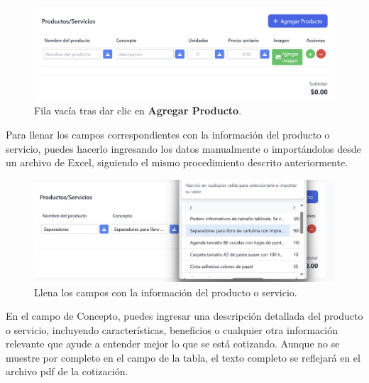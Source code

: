 \documentclass{Pretexto/bluereport}
\begin{document}
\begin{figure}[H] 
    \centering
        \includegraphics[width=0.8\linewidth]{img/agregar_producto.png}
    \caption{Fila vacía tras dar clic en \textbf{Agregar Producto}.}
    \label{fig:llenar_producto}
\end{figure}
Para llenar los campos correspondientes con la información del producto o servicio, puedes hacerlo ingresando
los datos manualmente o importándolos desde un archivo de Excel, siguiendo el mismo procedimiento descrito anteriormente.
\begin{figure}[H] 
    \centering
        \includegraphics[width=0.8\linewidth]{img/concepto.png}
    \caption{Llena los campos con la información del producto o servicio.}
    \label{fig:llenar_producto}
\end{figure}
En el campo de Concepto, puedes ingresar una descripción detallada del producto o servicio, incluyendo características, beneficios o 
cualquier otra información relevante que ayude a entender mejor lo que se está cotizando. Aunque no se muestre por completo en el campo
de la tabla, el texto completo se reflejará en el archivo pdf de la cotización.
\end{document}

